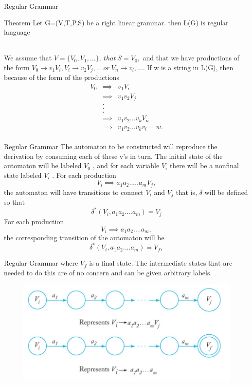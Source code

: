 \documentclass{beamer}
\begin{document}
\begin{frame}{Regular Grammar}
\begin{block}{Theorem}
Let G=(V,T,P,S) be a right linear grammar. then L(G) is regular language
\end{block}
\proofname \\
We assume that $V =\{V_0, V_1, ...\},\  that\  S = V_0,$ and that we have
productions of the form $V_0 \rightarrow v_1V_i, V_i \rightarrow v_2V_j, ...\  or\  V_n\rightarrow v_l, ....$ If w is a
string in L(G), then because of the form of the productions
\small
\begin{eqnarray*}
	V_0 &\implies& v_1V_i\\
	&\implies& v_1v_2V_j\\
	&.&\\
	&.&\\
	&.&\\
	&\implies& v_1v_2…v_kV_n\\
	&\implies& v_1v_2…v_kv_l = w.
\\
\end{eqnarray*}
\end{frame}
\begin{frame}{Regular Grammar}
	The automaton to be constructed will reproduce the derivation by
	consuming each of these v’s in turn. The initial state of the automaton will be labeled $V_0$
	, and for each variable $V_i$
	there will be a nonfinal state
	labeled $V_i$
	. For each production
	$$V_i \implies a_1a_2..... a_mV_j,$$
	the automaton will have transitions to connect $V_i$ and $V_j$
	that is, $\delta$ will be
	defined so that
	$$\delta^* (V_i, a_1a_2.... a_m) = V_j$$
	For each production
	$$V_i \implies a_1a_2.... a_m,$$
	the corresponding transition of the automaton will be
	$$\delta^* (V_i, a_1a_2.... a_m) = V_f
	,$$
\end{frame}	
\begin{frame}{Regular Grammar}
	where $V_f$
	is a final state. The intermediate states that are needed to do
	this are of no concern and can be given arbitrary labels.
	\begin{figure}
		\includegraphics[scale=.5]{img1/m3}
	\end{figure}

\end{frame}	
\end{document}
